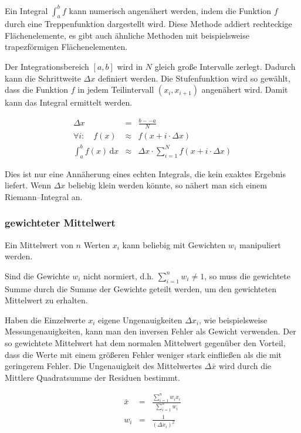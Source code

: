 \documentclass[12pt,a4paper]{scrartcl}
\numberwithin{equation}{section} %
\begin{document}
Ein Integral $\int_a^b f$ kann numerisch angenähert werden, indem die Funktion $f$ durch eine Treppenfunktion dargestellt wird. Diese Methode addiert rechteckige Flächenelemente, es gibt auch ähnliche Methoden mit beispielsweise trapezförmigen Flächenelementen.

Der Integrationsbereich $[a,b]$ wird in $N$ gleich große Intervalle zerlegt. Dadurch kann die Schrittweite $\Delta x$ definiert werden. Die Stufenfunktion wird so gewählt, dass die Funktion $f$ in jedem Teilintervall $(x_i, x_{i+1})$ angenähert wird. Damit kann das Integral ermittelt werden.

\begin{eqnarray}
  \Delta x &=& \frac{b--a}{N} \\
  \forall i:\quad
  f(x) &\approx& f(x+i\cdot\Delta x) \\
  \int_a^b f(x) \,\mathrm dx
  &\approx& \Delta x\cdot
  \sum_{i=1}^N f(x + i\cdot \Delta x)
\end{eqnarray}

\noindent
Dies ist nur eine Annäherung eines echten Integrals, die kein exaktes Ergebnis liefert. Wenn $\Delta x$ beliebig klein werden könnte, so nähert man sich einem Riemann--Integral an.

\hypertarget{gewichteter-mittelwert}{%
\subsubsection{gewichteter Mittelwert}\label{gewichteter-mittelwert}}

Ein Mittelwert von $n$ Werten $x_i$ kann beliebig mit Gewichten $w_i$ manipuliert werden.

Sind die Gewichte $w_i$ nicht normiert, d.h. $\sum_{i=1}^n w_i\neq 1$, so muss die gewichtete Summe durch die Summe der Gewichte geteilt werden, um den gewichteten Mittelwert zu erhalten.

Haben die Einzelwerte $x_i$ eigene Ungenauigkeiten $\Delta x_i$, wie beispielsweise Messungenauigkeiten, kann man den inversen Fehler als Gewicht verwenden. Der so gewichtete Mittelwert hat dem normalen Mittelwert gegenüber den Vorteil, dass die Werte mit einem größeren Fehler weniger stark einfließen als die mit geringerem Fehler. Die Ungenauigkeit des Mittelwertes $\Delta \bar x$ wird durch die Mittlere Quadratsumme der Residuen bestimmt.

\begin{eqnarray}
  \bar{x} &=&
  \frac{\sum_{i=1}^n w_i x_i}{\sum_{i=1}^n w_i}\\
  w_i &=& \frac{1}{(\Delta x_i)^2}
\end{eqnarray}
\end{document}
